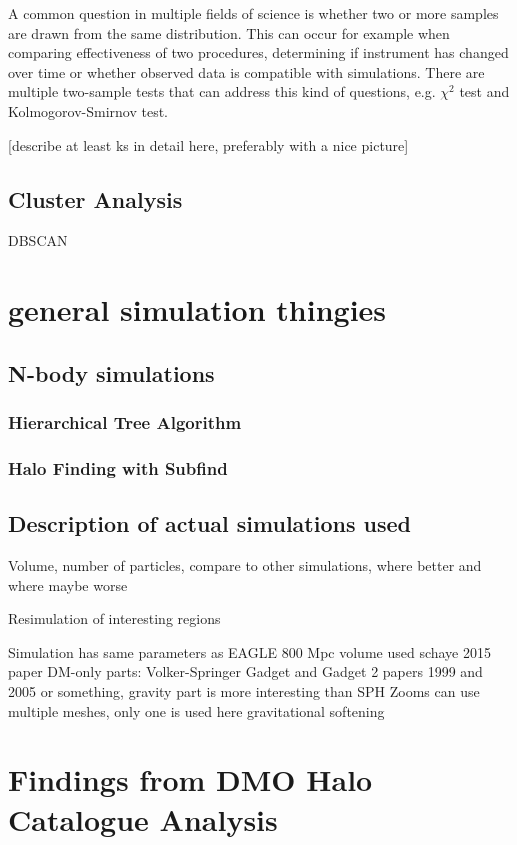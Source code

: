 \documentclass[english, oneside]{HYgradu}
\begin{document}
A common question in multiple fields of science is whether two or more samples are drawn from the same distribution. This can occur for example when comparing effectiveness of two procedures, determining if instrument has changed over time or whether observed data is compatible with simulations. There are multiple two-sample tests that can address this kind of questions, e.g. $\chi^2$ test and Kolmogorov-Smirnov test. \cite{bohm2010introduction}

[describe at least ks in detail here, preferably with a nice picture]


\section{Cluster Analysis}
DBSCAN

\chapter{general simulation thingies}
\section{N-body simulations}
\subsection{Hierarchical Tree Algorithm}
\subsection{Halo Finding with Subfind} %

\section{Description of actual simulations used}
Volume, number of particles, compare to other simulations, where better and where maybe worse

Resimulation of interesting regions

Simulation has same parameters as EAGLE
800 Mpc volume used
schaye 2015 paper
DM-only parts: Volker-Springer Gadget and Gadget 2 papers 1999 and 2005 or something,     gravity part is more interesting than SPH 
Zooms can use multiple meshes, only one is used here
gravitational softening

\chapter{Findings from DMO Halo Catalogue Analysis}
\end{document}
